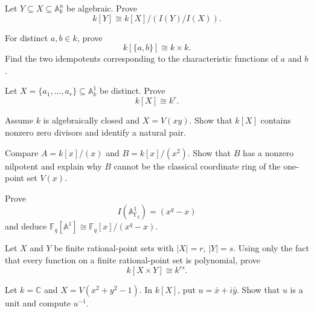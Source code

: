 \begin{exercise}\label{ex:vi03-closed-subset}
Let \(Y\subseteq X\subseteq\mathbb A_k^n\) be algebraic.  Prove
\[
k[Y]\cong k[X]/(I(Y)/I(X)).
\]
\end{exercise}

\begin{exercise}\label{ex:vi03-two-points}
For distinct \(a,b\in k\), prove
\[
k[\{a,b\}]\cong k\times k.
\]
Find the two idempotents corresponding to the characteristic functions of \(a\) and \(b\).
\end{exercise}

\begin{exercise}\label{ex:vi03-finite-points}
Let \(X=\{a_1,\dots,a_r\}\subseteq\mathbb A_k^1\) be distinct.  Prove
\[
k[X]\cong k^r.
\]
\end{exercise}

\begin{exercise}\label{ex:vi03-zero-divisors}
Assume \(k\) is algebraically closed and \(X=V(xy)\).  Show that \(k[X]\) contains nonzero
zero divisors and identify a natural pair.
\end{exercise}

\begin{exercise}\label{ex:vi03-nilpotent-warning}
Compare \(A=k[x]/(x)\) and \(B=k[x]/(x^2)\).  Show that \(B\) has a nonzero nilpotent and
explain why \(B\) cannot be the classical coordinate ring of the one-point set \(V(x)\).
\end{exercise}

\begin{exercise}\label{ex:vi03-finite-field-line}
Prove
\[
I(\mathbb A^1_{\mathbb F_q})=(x^q-x)
\]
and deduce \(\mathbb F_q[\mathbb A^1]\cong\mathbb F_q[x]/(x^q-x)\).
\end{exercise}

\begin{exercise}\label{ex:vi03-product-finite}
Let \(X\) and \(Y\) be finite rational-point sets with \(|X|=r\), \(|Y|=s\).  Using only the
fact that every function on a finite rational-point set is polynomial, prove
\[
k[X\times Y]\cong k^{rs}.
\]
\end{exercise}

\begin{exercise}\label{ex:vi03-circle-unit}
Let \(k=\mathbb C\) and \(X=V(x^2+y^2-1)\).  In \(k[X]\), put
\(u=\bar x+i\bar y\).  Show that \(u\) is a unit and compute \(u^{-1}\).
\end{exercise}
